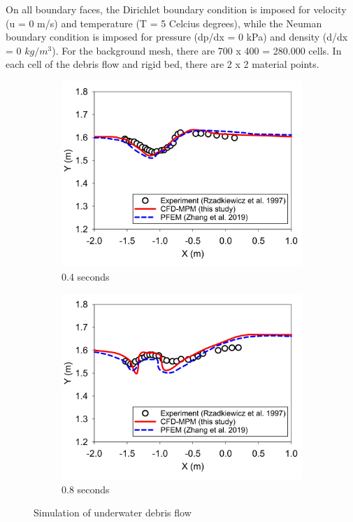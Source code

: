 \documentclass[preprint,12pt]{elsarticle}
\begin{document}
On all boundary faces, the Dirichlet boundary condition is imposed for velocity (u = 0 m/s) and temperature (T = 5 Celcius degrees), while the Neuman boundary condition is imposed for pressure (dp/dx = 0 kPa) and density (d/dx = 0 $kg/m^3$). For the background mesh, there are 700 x 400 = 280.000 cells. In each cell of the debris flow and rigid bed, there are 2 x 2 material points. \\
%
%
\begin{figure}[h]
\center
\begin{subfigure}[c]{0.5\linewidth}
\includegraphics[width=\linewidth]{0.4swater.jpg}
\caption{0.4 seconds}
\label{0.4swater}
\end{subfigure}\hfill    
\begin{subfigure}[d]{0.5\linewidth}
\includegraphics[width=\linewidth]{0.8swater.jpg}
\caption{0.8 seconds}
\label{0.8swater}
\end{subfigure}
\caption{Simulation of underwater debris flow}
\label{watersurface}
\end{figure}
\end{document}
